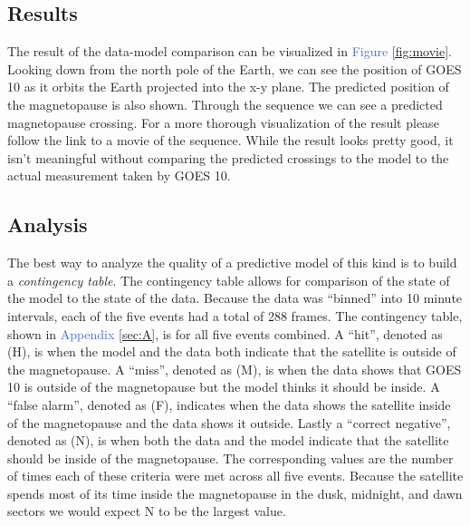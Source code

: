 \documentclass[12pt, letterpaper]{article}
\begin{document}
\subsection{Results}
The result of the data-model comparison can be visualized in \textcolor{RoyalBlue}{Figure \ref{fig:movie}}. Looking down from the north pole of the Earth, we can see the position of GOES 10 as it orbits the Earth projected into the x-y plane. The predicted position of the magnetopause is also shown. Through the sequence we can see a predicted magnetopause crossing. For a more thorough visualization of the result please follow the link to a movie of the sequence. While the result looks pretty good, it isn't meaningful without comparing the predicted crossings to the model to the actual measurement taken by GOES 10.

\subsection{Analysis}
The best way to analyze the quality of a predictive model of this kind is to build a \emph{contingency table}. The contingency table allows for comparison of the state of the model to the state of the data. Because the data was \enquote{binned} into 10 minute intervals, each of the five events had a total of 288 frames. The contingency table, shown in \textcolor{RoyalBlue}{Appendix \ref{sec:A}}, is for all five events combined. A \enquote{hit}, denoted as (H), is when the model and the data both indicate that the satellite is outside of the magnetopause. A \enquote{miss}, denoted as (M), is when the data shows that GOES 10 is outside of the magnetopause but the model thinks it should be inside. A \enquote{false alarm}, denoted as (F), indicates when the data shows the satellite inside of the magnetopause and the data shows it outside. Lastly a \enquote{correct negative}, denoted as (N), is when both the data and the model indicate that the satellite should be inside of the magnetopause. The corresponding values are the number of times each of these criteria were met across all five events. Because the satellite spends most of its time inside the magnetopause in the dusk, midnight, and dawn sectors we would expect N to be the largest value.
\end{document}
